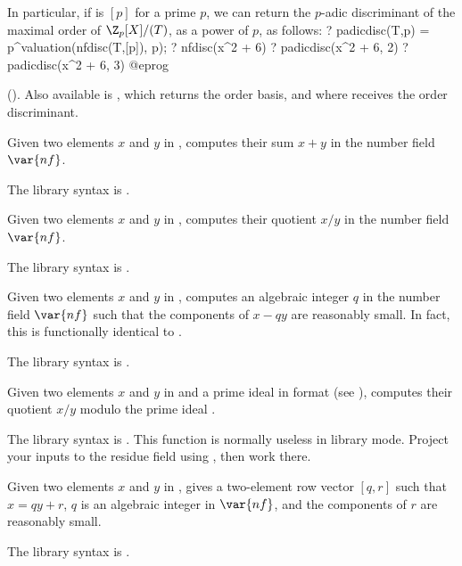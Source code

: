 In particular, if  is $[p]$ for a prime $p$, we can
return the $p$-adic discriminant of the maximal order of $\Z_p[X]/(T)$,
as a power of $p$, as follows:
\bprog
? padicdisc(T,p) = p^valuation(nfdisc(T,[p]), p);
? nfdisc(x^2 + 6)
? padicdisc(x^2 + 6, 2)
? padicdisc(x^2 + 6, 3)
@eprog

 (). Also available is
, which returns the order
basis, and where  receives the order discriminant.

\label{se:nfeltadd}
Given two elements $x$ and $y$ in
, computes their sum $x+y$ in the number field $\var{nf}$.

The library syntax is .

\label{se:nfeltdiv}
Given two elements $x$ and $y$ in
, computes their quotient $x/y$ in the number field $\var{nf}$.

The library syntax is .

\label{se:nfeltdiveuc}
Given two elements $x$ and $y$ in
, computes an algebraic integer $q$ in the number field $\var{nf}$
such that the components of $x-qy$ are reasonably small. In fact, this is
functionally identical to .

The library syntax is .

\label{se:nfeltdivmodpr}
Given two elements $x$
and $y$ in  and  a prime ideal in  format (see
), computes their quotient $x / y$ modulo the prime ideal
.

The library syntax is .
This function is normally useless in library mode. Project your
inputs to the residue field using , then work there.

\label{se:nfeltdivrem}
Given two elements $x$ and $y$ in
, gives a two-element row vector $[q,r]$ such that $x=qy+r$, $q$ is
an algebraic integer in $\var{nf}$, and the components of $r$ are
reasonably small.

The library syntax is .

